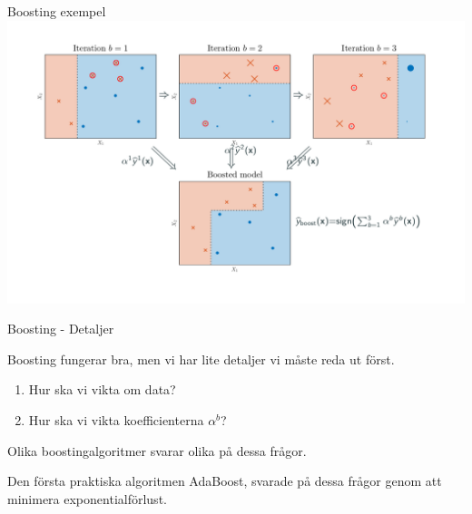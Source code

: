 \documentclass[10pt,english]{beamer}
\begin{document}
\begin{frame}{Boosting exempel}
    \includegraphics[width=\textwidth]{figs/Boosting illustration10.png}
\end{frame}

\begin{frame}{Boosting - Detaljer}
    
    Boosting fungerar bra, men vi har lite detaljer vi måste reda ut först.

    \begin{enumerate}
        \item Hur ska vi vikta om data?
        \item Hur ska vi vikta koefficienterna $\alpha^b$?
    \end{enumerate}

    Olika boostingalgoritmer svarar olika på dessa frågor.

    Den första praktiska algoritmen AdaBoost, svarade på dessa frågor genom att minimera exponentialförlust.

\end{frame}
\end{document}

